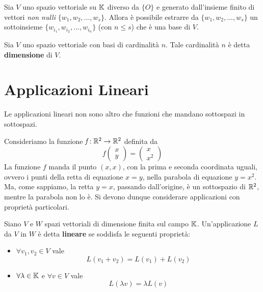 \begin{theorem}
	Sia $V$ uno spazio vettoriale su $\mathbb{K}$ diverso da $\{O\}$ e generato dall'insieme finito di vettori
	\emph{non nulli} $\{w_1, w_2, ..., w_s\}$. Allora è possibile estrarre da $\{w_1, w_2, ..., w_s\}$ un
	sottoinsieme $\{w_{i_1}, w_{i_2}, ..., w_{i_n}\}$ (con $n \leq s$) che è una base di $V$.
\end{theorem}

\begin{definition}
	Sia $V$  uno spazio vettoriale con basi di cardinalità $n$. Tale cardinalità $n$ è detta \textbf{dimensione}
	di $V$.
\end{definition}

\section{Applicazioni Lineari}
Le applicazioni lineari non sono altro che funzioni che mandano sottospazi in sottospazi.

\begin{example}
	Consideriamo la funzione $\textit{f} : \mathbb{R}^2 \to \mathbb{R}^2$ definita da
	\[
		f \begin{pmatrix}
			x \\ y
		\end{pmatrix}
		=
		\begin{pmatrix}
			x \\ x^2
		\end{pmatrix}
	\]
	La funzione $f$ manda il punto $(x, x)$, con la prima e seconda coordinata uguali, ovvero i punti della
	retta di equazione $x = y$, nella parabola di equazione $y = x^2$. Ma, come sappiamo, la retta $y = x$,
	passando dall'origine, è un sottospazio di $\mathbb{R}^2$, mentre la parabola non lo è. Si devono dunque
	considerare applicazioni con proprietà particolari.
\end{example}

\begin{definition}
	Siano $V$ e $W$ spazi vettoriali di dimensione finita sul campo $\mathbb{K}$. Un'applicazione $L$ da $V$
	in $W$ è detta \textbf{lineare} se soddisfa le seguenti proprietà:
	\begin{itemize}
		\item $\forall v_1, v_2 \in V$ vale
		      \[ L(v_1 + v_2) = L(v_1) + L(v_2) \]
		\item $\forall \lambda \in \mathbb{K}$ e $\forall v \in V$ vale
		      \[ L(\lambda v) = \lambda L(v) \]
	\end{itemize}
\end{definition}

